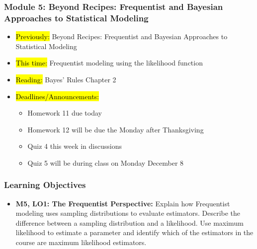 
\begin{frame}
    \frametitle{Module 5: Beyond Recipes: Frequentist and Bayesian Approaches to Statistical Modeling}
    \begin{itemize}
        \item \hl{Previously: }Beyond Recipes: Frequentist and Bayesian Approaches to Statistical Modeling
        \item \hl{This time: }Frequentist modeling using the likelihood function
        \item \hl{Reading: }Bayes' Rules Chapter 2
        \item \hl{Deadlines/Announcements: }
        \begin{itemize}
            \item Homework 11 due today
            \item Homework 12 will be due the Monday after Thanksgiving
            \item Quiz 4 this week in discussions
            \item Quiz 5 will be during class on Monday December 8
        \end{itemize}
    \end{itemize}
\end{frame}

\begin{frame}
    \frametitle{Learning Objectives}
    \begin{itemize}
        \item \textbf{M5, LO1: The Frequentist Perspective:} Explain how Frequentist modeling uses sampling distributions to evaluate estimators. Describe the difference between a sampling distribution and a likelihood. Use maximum likelihood to estimate a parameter and identify which of the estimators in the course are maximum likelihood estimators.
    \end{itemize}
\end{frame}

